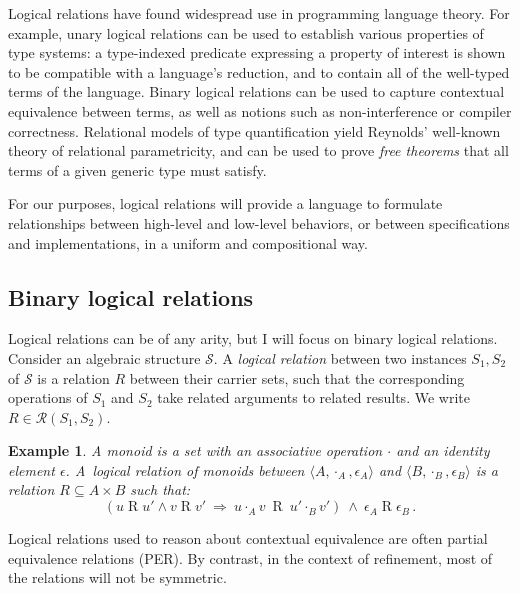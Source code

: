\documentclass[11pt,oneside]{book}
\newtheorem{example}[theorem]{Example}
\theoremstyle{definition}
\begin{document}
Logical relations have found widespread use in programming language theory.
For example,
unary logical relations can be used to establish
various properties of type systems:
a type-indexed predicate expressing a property of interest
is shown to be compatible with a language's reduction,
and to contain all of the well-typed terms of the language.
Binary logical relations can be used to capture
contextual equivalence between terms,
as well as notions such as non-interference or compiler correctness.
Relational models of type quantification yield
Reynolds' well-known theory of relational parametricity,
and can be used to prove \emph{free theorems} that
all terms of a given generic type must satisfy.

For our purposes,
logical relations will provide a language to formulate
relationships between high-level and low-level behaviors,
or between specifications and implementations,
in a uniform and compositional way.


\subsection{Binary logical relations}

Logical relations can be of any arity,
but
I will focus on
binary logical relations.
Consider an algebraic structure $\mathcal{S}$.
A \emph{logical relation}
between two instances $S_1, S_2$ of $\mathcal{S}$
is a relation $R$
between their carrier sets,
such that the corresponding operations of $S_1$ and $S_2$
take related arguments to related results.
We write $R \in \mathcal{R}(S_1, S_2)$.

\begin{example}%
\label{ex:monoid}
A monoid is a set with
an associative operation $\cdot$ and
an identity element $\epsilon$.
A~\emph{logical relation of monoids} between
$\langle A, \cdot_A, \epsilon_A \rangle$ and
$\langle B, \cdot_B, \epsilon_B \rangle$
is a relation $R \subseteq A \times B$
such that:
\begin{equation}
\label{eqn:monoidrel}
(u \mathrel{R} u' \wedge v \mathrel{R} v' \: \Rightarrow \:
 u \cdot_A v \: \mathrel{R} \: u' \cdot_B v')
\: \wedge \:
\epsilon_A \mathrel{R} \epsilon_B \,.
\end{equation}
\end{example}

Logical relations used to reason about contextual equivalence
are often partial equivalence relations (PER).
By contrast, in the context of refinement,
most of the relations will not be symmetric.
\end{document}
